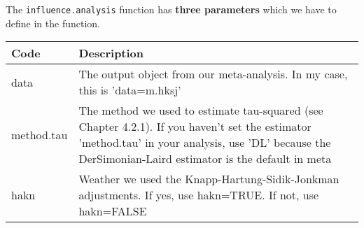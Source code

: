 \documentclass[]{book}
\newenvironment{Shaded}{\begin{snugshade}}{\end{snugshade}}
\newcommand{\KeywordTok}[1]{\textcolor[rgb]{0.13,0.29,0.53}{\textbf{#1}}}
\newcommand{\DataTypeTok}[1]{\textcolor[rgb]{0.13,0.29,0.53}{#1}}
\newcommand{\DecValTok}[1]{\textcolor[rgb]{0.00,0.00,0.81}{#1}}
\newcommand{\StringTok}[1]{\textcolor[rgb]{0.31,0.60,0.02}{#1}}
\newcommand{\ControlFlowTok}[1]{\textcolor[rgb]{0.13,0.29,0.53}{\textbf{#1}}}
\newcommand{\OperatorTok}[1]{\textcolor[rgb]{0.81,0.36,0.00}{\textbf{#1}}}
\newcommand{\NormalTok}[1]{#1}
\theoremstyle{definition}
\theoremstyle{definition}
\theoremstyle{definition}
\theoremstyle{remark}
\begin{document}
\begin{Shaded}
\end{Shaded}

The \texttt{influence.analysis} function has \textbf{three parameters}
which we have to define in the function.

\begin{tabular}{l|l}
\hline
Code & Description\\
\hline
data & The output object from our meta-analysis. In my case, this is 'data=m.hksj'\\
\hline
method.tau & The method we used to estimate tau-squared (see Chapter 4.2.1). If you haven't set the estimator 'method.tau' in your analysis, use 'DL' because the DerSimonian-Laird estimator is the default in meta\\
\hline
hakn & Weather we used the Knapp-Hartung-Sidik-Jonkman adjustments. If yes, use hakn=TRUE. If not, use hakn=FALSE\\
\hline
\end{tabular}
\end{document}
